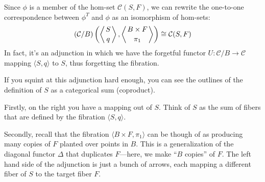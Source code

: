 \documentclass[DaoFP]{subfiles}
\begin{document}
 Since $\phi$ is a member of the hom-set $ \mathcal{C}(S, F)$, we can rewrite the one-to-one correspondence between $\phi^T$ and  $\phi$ as an isomorphism of hom-sets:
\[  (\mathcal{C}/B)\left(\left \langle {S \atop q} \right \rangle, \left \langle {B \times F \atop \pi_1} \right \rangle \right) \cong \mathcal{C}(S, F) \]
In fact, it's an adjunction in which we have the forgetful functor $U \colon \mathcal{C}/B \to \mathcal{C}$ mapping $\langle S, q \rangle$ to $S$, thus forgetting the fibration.

If you squint at this adjunction hard enough, you can see the outlines of the definition of $S$ as a categorical sum (coproduct). 

Firstly, on the right you have a mapping out of $S$. Think of $S$ as the sum of fibers that are defined by the fibration $\langle S, q \rangle$. 

Secondly, recall that the fibration $\langle B \times F, \pi_1 \rangle$ can be though of as producing many copies of $F$ planted over points in $B$. This is a generalization of the diagonal functor $\Delta$ that duplicates $F$---here, we make ``$B$ copies'' of $F$. The left hand side of the adjunction is just a bunch of arrows, each mapping a different fiber of $S$ to the target fiber $F$. 
\end{document}

